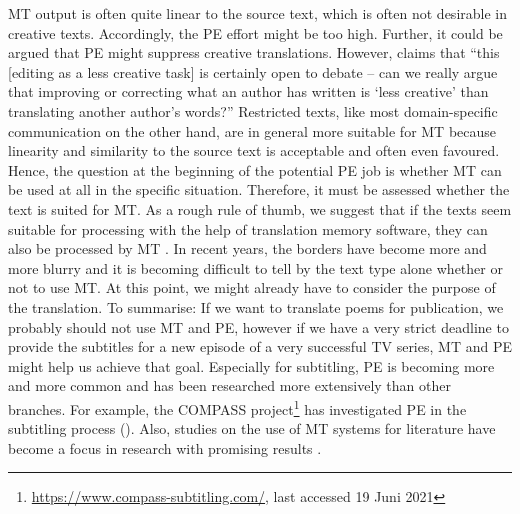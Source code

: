 MT output is often quite linear to the source text, which is often not desirable in creative texts. Accordingly, the PE effort might be too high. Further, it could be argued that PE might suppress creative translations. However, \citet[113]{o2012translation} claims that “this [editing as a less creative task] is certainly open to debate – can we really argue that improving or correcting what an author has written is ‘less creative’ than translating another author’s words?” Restricted texts, like most domain-specific communication on the other hand, are in general more suitable for MT because linearity and similarity to the source text is acceptable and often even favoured. Hence, the question at the beginning of the potential PE job is whether MT can be used at all in the specific situation. Therefore, it must be assessed whether the text is suited for MT. As a rough rule of thumb, we suggest that if the texts seem suitable for processing with the help of  translation memory software, they can also be processed by MT \citep[221--224]{arnhold_maschinelle_2017}. In recent years, the borders have become more and more blurry and it is becoming difficult to tell by the text type alone whether or not to use MT. At this point, we might already have to consider the purpose of the translation. To summarise: If we want to translate poems for publication, we probably should not use MT and PE, however if we have a very strict deadline to provide the subtitles for a new episode of a very successful TV series, MT and PE might help us achieve that goal. Especially for subtitling, PE is becoming more and more common and has been researched more extensively than other branches. For example, the COMPASS project\footnote{\url{https://www.compass-subtitling.com/}, last accessed 19 Juni 2021} has investigated PE in the subtitling process (\citealt{tardel2020effort}). Also, studies on the use of MT systems for literature have become a focus in research with promising results \citep{toral2018post}. 

